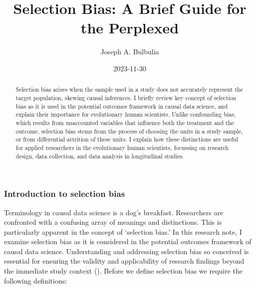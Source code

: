 \documentclass[
  singlecolumn,
  9pt]{article}
\title{Selection Bias: A Brief Guide for the Perplexed}
\author{Joseph A. Bulbulia}
\affil{%
                  Victoria University of Wellington, New Zealand
              }
\date{2023-11-30}
\begin{document}
\maketitle
\begin{abstract}
Selection bias arises when the sample used in a study does not
accurately represent the target population, skewing causal inferences. I
briefly review key concept of selection bias as it is used in the
potential outcomes framework in causal data science, and explain their
importance for evolutionary human scientists. Unlike confounding bias,
which results from unaccounted variables that influence both the
treatment and the outcome, selection bias stems from the process of
choosing the units in a study sample, or from differential attrition of
these units. I explain how these distinctions are useful for applied
researchers in the evolutionary human scientists, focussing on research
design, data collection, and data analysis in longitudinal studies.
\end{abstract}
\subsubsection{Introduction to selection
bias}\label{introduction-to-selection-bias}

Terminology in causal data science is a dog's breakfast. Researchers are
confronted with a confusing array of meanings and distinctions. This is
particularly apparent in the concept of `selection bias.' In this
research note, I examine selection bias as it is considered in the
potential outcomes framework of causal data science. Understanding and
addressing selection bias so conceived is essential for ensuring the
validity and applicability of research findings beyond the immediate
study context (). Before we
define selection bias we require the following definitions:
\end{document}
